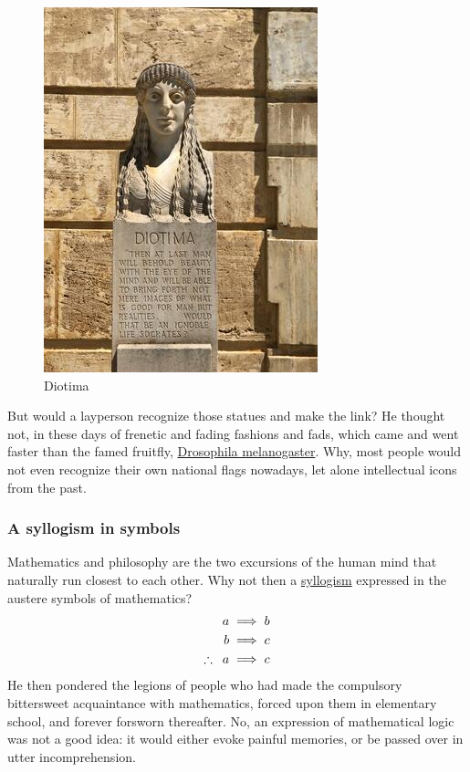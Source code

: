 \documentclass[
  a4paper,
]{article}
\begin{document}
\begin{figure}
\centering
\includegraphics{images/diotima-2.jpg}
\caption{Diotima}
\end{figure}

But would a layperson recognize those statues and make the link? He
thought not, in these days of frenetic and fading fashions and fads,
which came and went faster than the famed fruitfly,
\href{https://en.wikipedia.org/wiki/Drosophila_melanogaster\#Lifecycle_and_reproduction}{Drosophila
melanogaster}. Why, most people would not even recognize their own
national flags nowadays, let alone intellectual icons from the past.

\hypertarget{a-syllogism-in-symbols}{%
\subsubsection{A syllogism in symbols}\label{a-syllogism-in-symbols}}

Mathematics and philosophy are the two excursions of the human mind that
naturally run closest to each other. Why not then a
\href{https://www.lexico.com/en/definition/syllogism}{syllogism}
expressed in the austere symbols of mathematics? \[
\begin{aligned}
a &\implies b\\
b &\implies c\\
\therefore\hspace{0.5em}a &\implies c
\end{aligned}
\] He then pondered the legions of people who had made the compulsory
bittersweet acquaintance with mathematics, forced upon them in
elementary school, and forever forsworn thereafter. No, an expression of
mathematical logic was not a good idea: it would either evoke painful
memories, or be passed over in utter incomprehension.
\end{document}
